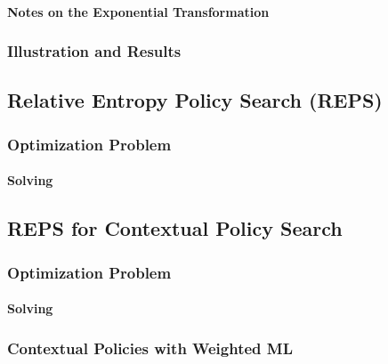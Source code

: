 				\paragraph{Notes on the Exponential Transformation} %

			\subsubsection{Illustration and Results} %

		\subsection{Relative Entropy Policy Search (REPS)} %

			\subsubsection{Optimization Problem} %

				\paragraph{Solving} %

		\subsection{REPS for Contextual Policy Search} %

			\subsubsection{Optimization Problem} %

				\paragraph{Solving} %

			\subsubsection{Contextual Policies with Weighted ML} %

